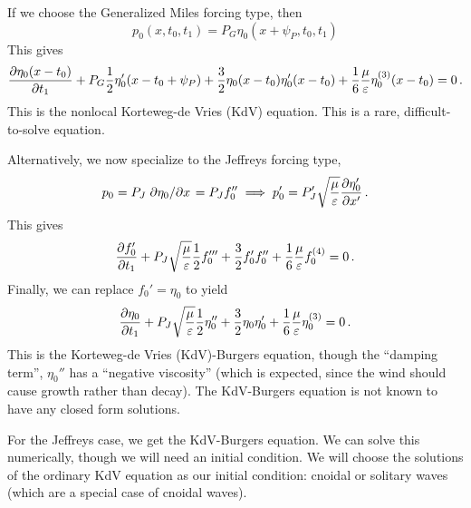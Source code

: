 \documentclass{jfm}
\renewcommand*{\epsilon}{\varepsilon}
\begin{document}
If we choose the Generalized Miles forcing type, then
\[
  p_0(x,t_0,t_1) = P_G \eta_0(x+\psi_P,t_0,t_1)
\]
This gives
\begin{equation}
  \pdv{\eta_0(x-t_0)}{t_1} + P_G \frac{1}{2} \eta_0'(x-t_0+\psi_P) +
  \frac{3}{2} \eta_0(x-t_0) \eta_0'(x-t_0) + \frac{1}{6}
  \frac{\mu}{\epsilon} \eta_0^{(3)}(x-t_0) = 0 \,.
  \label{eq:kdv_burgers_gen}
\end{equation}
This is the nonlocal Korteweg-de Vries (KdV) equation.
This is a rare, difficult-to-solve equation.

Alternatively, we now specialize to the Jeffreys forcing type,
\begin{equation}
  p_0 = P_J \pdv*{\eta_0}{x} = P_J f_0''
  \implies p'_0 = P'_J \sqrt{\frac{\mu}{\epsilon}} \pdv{\eta'_0}{x'}
  \,.
\end{equation}
This gives
\begin{equation}
   \pdv{f_0'}{t_1} + P_J \sqrt{\frac{\mu}{\epsilon}} \frac{1}{2} f_0'''
   + \frac{3}{2} f_0' f_0'' + \frac{1}{6} \frac{\mu}{\epsilon} f_0^{(4)}
   = 0 \,.
\end{equation}
Finally, we can replace $f_0' = \eta_0$ to yield
\begin{equation}
   \pdv{\eta_0}{t_1} + P_J \sqrt{\frac{\mu}{\epsilon}} \frac{1}{2}
   \eta_0'' + \frac{3}{2} \eta_0 \eta_0' + \frac{1}{6}
   \frac{\mu}{\epsilon} \eta_0^{(3)} = 0 \,.
  \label{eq:kdv_burgers}
\end{equation}
This is the Korteweg-de Vries (KdV)-Burgers equation, though the
``damping term'', $\eta_0''$ has a ``negative viscosity'' (which is
expected, since the wind should cause growth rather than decay).
The KdV-Burgers equation is not known to have any closed form solutions.

For the Jeffreys case, we get the KdV-Burgers equation.
We can solve this numerically, though we will need an initial condition.
We will choose the solutions of the ordinary KdV equation as our initial
condition: cnoidal or solitary waves (which are a special case of
cnoidal waves).
\end{document}
